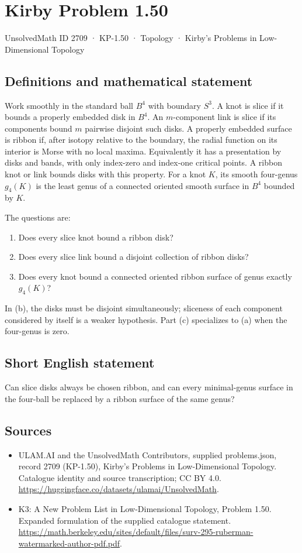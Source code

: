 \documentclass[11pt,a4paper]{article}
\begin{document}
\section*{Kirby Problem 1.50}\label{2709}
{\small UnsolvedMath ID 2709 · KP-1.50 · Topology · Kirby's Problems in Low-Dimensional Topology}
\subsection{Definitions and mathematical statement}
Work smoothly in the standard ball $B^4$ with boundary $S^3$.
A knot is slice if it bounds a properly embedded disk in $B^4$. An
$m$-component link is slice if its components bound $m$ pairwise disjoint such
disks. A properly embedded surface is ribbon if, after isotopy relative to the
boundary, the radial function on its interior is Morse with no local maxima.
Equivalently it has a presentation by disks and bands, with only index-zero and
index-one critical points. A ribbon knot or link bounds disks with this property.
For a knot $K$, its smooth four-genus $g_4(K)$ is the least genus of a connected
oriented smooth surface in $B^4$ bounded by $K$.

The questions are:
\begin{enumerate}
\item Does every slice knot bound a ribbon disk?
\item Does every slice link bound a disjoint collection of ribbon disks?
\item Does every knot bound a connected oriented ribbon surface of genus
exactly $g_4(K)$?
\end{enumerate}
In (b), the disks must be disjoint simultaneously; sliceness of each component
considered by itself is a weaker hypothesis. Part (c) specializes to (a) when
the four-genus is zero.
\subsection{Short English statement}
Can slice disks always be chosen ribbon, and can every minimal-genus surface in the four-ball be replaced by a ribbon surface of the same genus?
\subsection{Sources}
\begin{itemize}
\item[S1] ULAM.AI and the UnsolvedMath Contributors, supplied problems.json, record 2709 (KP-1.50), Kirby's Problems in Low-Dimensional Topology. Catalogue identity and source transcription; CC BY 4.0.
\url{https://huggingface.co/datasets/ulamai/UnsolvedMath}.
\item[S2] K3: A New Problem List in Low-Dimensional Topology, Problem 1.50. Expanded formulation of the supplied catalogue statement.
\url{https://math.berkeley.edu/sites/default/files/surv-295-ruberman-watermarked-author-pdf.pdf}.
\end{itemize}
\end{document}
